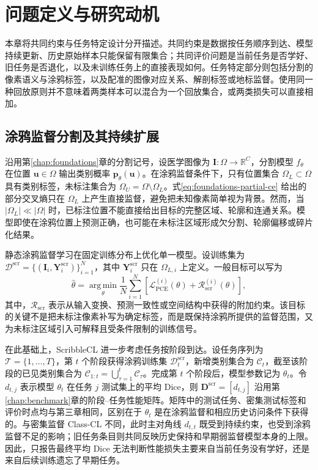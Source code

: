 \section{问题定义与研究动机}
\label{sec:task-cl-formulation}

本章将共同约束与任务特定设计分开描述。共同约束是数据按任务顺序到达、模型持续更新、历史原始样本只能保留有限集合；共同评价问题是当前任务是否学好、旧任务是否退化，以及未训练任务上的直接表现如何。任务特定部分则包括分割的像素语义与涂鸦标签，以及配准的图像对应关系、解剖标签或地标监督。使用同一种回放原则并不意味着两类样本可以混合为一个回放集合，或两类损失可以直接相加。

\subsection{涂鸦监督分割及其持续扩展}
\label{subsec:task-cl-scribble-formulation}

沿用第\ref{chap:foundations}章的分割记号，设医学图像为
$\mathbf{I}:\Omega\rightarrow\mathbb{R}^{C}$，分割模型
$f_{\theta}$ 在位置 $\mathbf{u}\in\Omega$ 输出类别概率
$\mathbf{p}_{\theta}(\mathbf{u})$。在涂鸦监督条件下，只有位置集合
$\Omega_L\subset\Omega$ 具有类别标签，未标注集合为
$\Omega_U=\Omega\setminus\Omega_L$。式\eqref{eq:foundations-partial-ce}
给出的部分交叉熵只在 $\Omega_L$ 上产生直接监督，避免把未知像素简单视为背景。然而，当 $|\Omega_L|\ll|\Omega|$ 时，已标注位置不能直接给出目标的完整区域、轮廓和连通关系。模型即使在涂鸦位置上预测正确，也可能在未标注区域形成欠分割、轮廓偏移或碎片化结果。

静态涂鸦监督学习在固定训练分布上优化单一模型。设训练集为
$\mathcal{D}^{\mathrm{scr}}=\{(\mathbf{I}_i,\mathbf{Y}^{\mathrm{scr}}_i)\}_{i=1}^{N}$，其中
$\mathbf{Y}^{\mathrm{scr}}_i$ 只在 $\Omega_{L,i}$ 上定义。一般目标可以写为
\begin{equation}
\widehat{\theta}
=
\operatorname*{arg\,min}_{\theta}
\frac{1}{N}\sum_{i=1}^{N}
\left[
\mathcal{L}_{\mathrm{PCE}}^{(i)}(\theta)
+
\mathcal{R}_{\mathrm{scr}}^{(i)}(\theta)
\right],
\label{eq:scribble-static-objective}
\end{equation}
其中，$\mathcal{R}_{\mathrm{scr}}$ 表示从输入变换、预测一致性或空间结构中获得的附加约束。该目标的关键不是把未标注像素补写为确定标签，而是既保持涂鸦所提供的监督范围，又为未标注区域引入可解释且受条件限制的训练信号。

在此基础上，ScribbleCL 进一步考虑任务按阶段到达。设任务序列为
$\mathcal{T}=\{1,\ldots,T\}$，第 $t$ 个阶段获得涂鸦训练集
$\mathcal{D}^{\mathrm{scr}}_t$，新增类别集合为 $\mathcal{C}_t$，截至该阶段的已见类别集合为
$\mathcal{C}_{1:t}=\bigcup_{\tau=1}^{t}\mathcal{C}_{\tau}$。完成第 $t$ 个阶段后，模型参数记为 $\theta_t$。令
$d_{t,j}$ 表示模型 $\theta_t$ 在任务 $j$ 测试集上的平均 Dice，则
$\mathbf{D}^{\mathrm{scr}}=[d_{t,j}]$ 沿用第\ref{chap:benchmark}章的阶段--任务性能矩阵。矩阵中的测试任务、密集测试标签和评价时点均与第三章相同，区别在于 $\theta_t$ 是在涂鸦监督和相应历史访问条件下获得的。与密集监督 Class-CL 不同，此时主对角线 $d_{t,t}$ 既受到持续约束，也受到涂鸦监督不足的影响；旧任务条目则共同反映历史保持和早期弱监督模型本身的上限。因此，只报告最终平均 Dice 无法判断性能损失主要来自当前任务没有学好，还是来自后续训练遗忘了早期任务。

